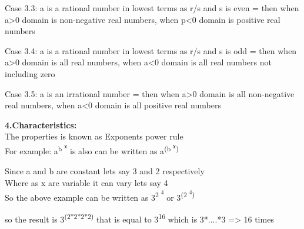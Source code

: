 \documentclass[a4paper,10pt]{article}
\begin{document}
\indent\indent
{\fontsize{12}{16}\selectfont Case 3.3: a is a rational number in lowest terms as r/s and s is even = then when a>0 domain is non-negative real numbers, when p<0 domain is positive real numbers  \\}


\indent\indent
{\fontsize{12}{16}\selectfont Case 3.4: a is a rational number in lowest terms as r/s and s is odd = then when a>0 domain is all real numbers, when a<0 domain is all real numbers not including zero  \\}


\indent\indent
{\fontsize{12}{16}\selectfont Case 3.5: a is an  irrational number = then when a>0 domain is all non-negative real numbers, when a<0 domain is all positive real numbers  \\}

{\Large\textbf{4.Characteristics:}\\}
\newline
\indent\indent
{\fontsize{12}{16}\selectfont The properties is known as Exponents power rule \\}
\newline
\indent\indent
{\fontsize{12}{16}\selectfont For example: a\textsuperscript{b \textsuperscript{x}} is also can be written as a\textsuperscript{(b \textsuperscript{x})}}

\indent\indent\indent
{\fontsize{12}{16}\selectfont Since a and b are constant lets say 3 and 2 respectively \\}
\indent\indent\indent
{\fontsize{12}{16}\selectfont Where as x are variable it can vary lets say 4  \\}
\newline
\indent\indent\indent
{\fontsize{12}{16}\selectfont So the above example can be written as 3\textsuperscript{2 \textsuperscript{4}} or 3\textsuperscript{(2 \textsuperscript{4})} \\ }

\indent\indent\indent
{\fontsize{12}{16}\selectfont so the result is 3\textsuperscript{(2*2*2*2)} that is equal to 3\textsuperscript{16} which is 3*....*3 => 16 times }
\pagebreak
\end{document}
